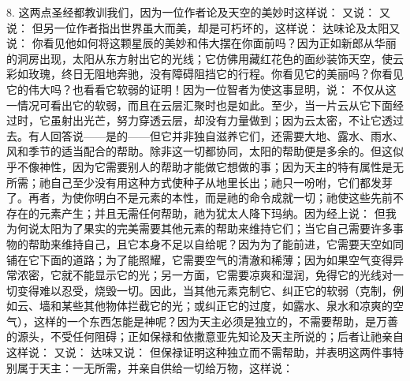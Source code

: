8. 这两点圣经都教训我们，因为一位作者论及天空的美妙时这样说：\newline{} 又说：\newline{} 又说：\newline{} 但另一位作者指出世界虽大而美，却是可朽坏的，这样说：\newline{} 达味论及太阳又说：\newline{} 你看见他如何将这颗星辰的美妙和伟大摆在你面前吗？因为正如新郎从华丽的洞房出现，太阳从东方射出它的光线；它仿佛用藏红花色的面纱装饰天空，使云彩如玫瑰，终日无阻地奔驰，没有障碍阻挡它的行程。你看见它的美丽吗？你看见它的伟大吗？也看看它软弱的证明！因为一位智者为使这事显明，说：\newline{} 不仅从这一情况可看出它的软弱，而且在云层汇聚时也是如此。至少，当一片云从它下面经过时，它虽射出光芒，努力穿透云层，却没有力量做到；因为云太密，不让它透过去。有人回答说——是的——但它并非独自滋养它们，还需要大地、露水、雨水、风和季节的适当配合的帮助。除非这一切都协同，太阳的帮助便是多余的。但这似乎不像神性，因为它需要别人的帮助才能做它想做的事；因为天主的特有属性是无所需；祂自己至少没有用这种方式使种子从地里长出；祂只一吩咐，它们都发芽了。再者，为使你明白不是元素的本性，而是祂的命令成就一切；祂使这些先前不存在的元素产生；并且无需任何帮助，祂为犹太人降下玛纳。因为经上说：\newline{} 但我为何说太阳为了果实的完美需要其他元素的帮助来维持它们；当它自己需要许多事物的帮助来维持自己，且它本身不足以自给呢？因为为了能前进，它需要天空如同铺在它下面的道路；为了能照耀，它需要空气的清澈和稀薄；因为如果空气变得异常浓密，它就不能显示它的光；另一方面，它需要凉爽和湿润，免得它的光线对一切变得难以忍受，烧毁一切。因此，当其他元素克制它、纠正它的软弱（克制，例如云、墙和某些其他物体拦截它的光；或纠正它的过度，如露水、泉水和凉爽的空气），这样的一个东西怎能是神呢？因为天主必须是独立的，不需要帮助，是万善的源头，不受任何阻碍；正如保禄和依撒意亚先知论及天主所说的；后者让祂亲自这样说：\newline{} 又说：\newline{} 达味又说：\newline{} 但保禄证明这种独立而不需帮助，并表明这两件事特别属于天主：一无所需，并亲自供给一切给万物，这样说：\par

